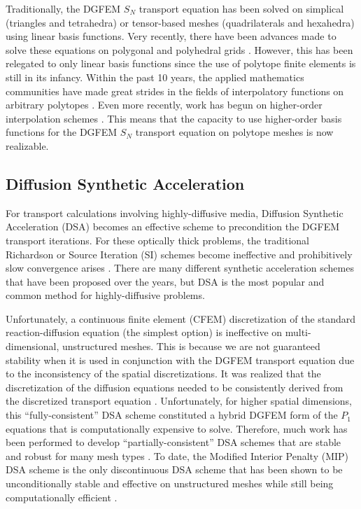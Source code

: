 Traditionally, the DGFEM $S_N$ transport equation has been solved on simplical (triangles and tetrahedra) or tensor-based meshes (quadrilaterals and hexahedra) using linear basis functions. Very recently, there have been advances made to solve these equations on polygonal and polyhedral grids \cite{davidson2008finite,ref::PWLD_stone_adams,ref::PWLD_stone_adams_unstructured,bailey2008phd}. However, this has been relegated to only linear basis functions since the use of polytope finite elements is still in its infancy. Within the past 10 years, the applied mathematics communities have made great strides in the fields of interpolatory functions on arbitrary polytopes \cite{sukumar2006recent}. Even more recently, work has begun on higher-order interpolation schemes \cite{rand2013interpolation}. This means that the capacity to use higher-order basis functions for the DGFEM $S_N$ transport equation on polytope meshes is now realizable. 

\subsection{Diffusion Synthetic Acceleration}
\label{sec::Intro_Past_DSA}

For transport calculations involving highly-diffusive media, Diffusion Synthetic Acceleration (DSA) becomes an effective scheme to precondition the DGFEM transport iterations. For these optically thick problems, the traditional Richardson or Source Iteration (SI) schemes become ineffective and prohibitively slow convergence arises \cite{ref::adams_larsen_iter_methods}. There are many different synthetic acceleration schemes that have been proposed over the years, but DSA is the most popular and common method for highly-diffusive problems.

Unfortunately, a continuous finite element (CFEM) discretization of the standard reaction-diffusion equation (the simplest option) is ineffective on multi-dimensional, unstructured meshes. This is because we are not guaranteed stability when it is used in conjunction with the DGFEM transport equation due to the inconsistency of the spatial discretizations. It was realized that the discretization of the diffusion equations needed to be consistently derived from the discretized transport equation \cite{alcouffe1976stable,alcouffe1977DSA,larsen1982unconditionally_I,larsen1982unconditionally_II,warsa2002fully}. Unfortunately, for higher spatial dimensions, this ``fully-consistent'' DSA scheme constituted a hybrid DGFEM form of the $P_1$ equations that is computationally expensive to solve. Therefore, much work has been performed to develop ``partially-consistent'' DSA schemes that are stable and robust for many mesh types \cite{ref::dsa_DFEM_adams_martin,wareing1991diffusion,ref::DSA_wang_ragusa}. To date, the Modified Interior Penalty (MIP) DSA scheme is the only discontinuous DSA scheme that has been shown to be unconditionally stable and effective on unstructured meshes while still being computationally efficient \cite{ref::DSA_wang_ragusa,turcksin2014discontinuous}.

